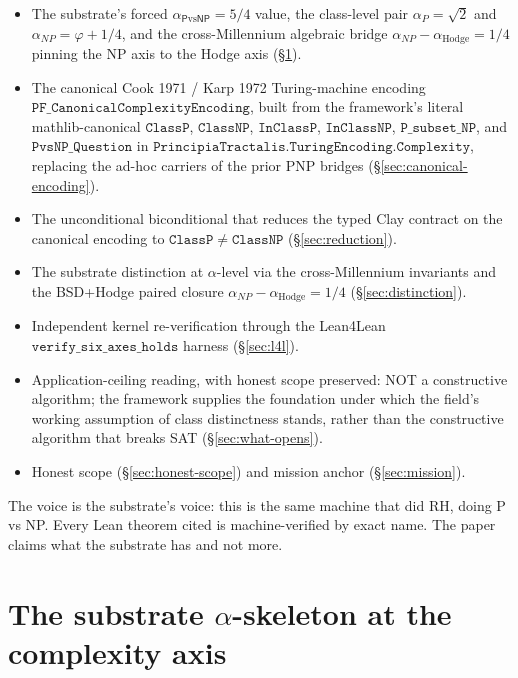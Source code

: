 \documentclass[11pt,a4paper]{article}
\theoremstyle{plain}
\theoremstyle{definition}
\begin{document}
\begin{itemize}[leftmargin=*,nosep]
\item The substrate's forced
  $\alpha_{\mathsf{P}\mathrm{vs}\mathsf{NP}} = 5/4$ value, the
  class-level pair $\alpha_{P} = \sqrt{2}$ and
  $\alpha_{NP} = \varphi + 1/4$, and the cross-Millennium algebraic
  bridge $\alpha_{NP} - \alpha_{\mathrm{Hodge}} = 1/4$ pinning the NP
  axis to the Hodge axis (\S\ref{sec:alpha-skeleton}).
\item The canonical Cook 1971 / Karp 1972 Turing-machine encoding
  $\mathtt{PF\_CanonicalComplexityEncoding}$, built from the
  framework's literal mathlib-canonical $\mathtt{ClassP}$,
  $\mathtt{ClassNP}$, $\mathtt{InClassP}$, $\mathtt{InClassNP}$,
  $\mathtt{P\_subset\_NP}$, and $\mathtt{PvsNP\_Question}$ in
  $\mathtt{PrincipiaTractalis.TuringEncoding.Complexity}$, replacing
  the ad-hoc carriers of the prior PNP bridges
  (\S\ref{sec:canonical-encoding}).
\item The unconditional biconditional that reduces the typed Clay
  contract on the canonical encoding to $\mathtt{ClassP} \neq
  \mathtt{ClassNP}$ (\S\ref{sec:reduction}).
\item The substrate distinction at $\alpha$-level via the
  cross-Millennium invariants and the BSD+Hodge paired closure
  $\alpha_{NP} - \alpha_{\mathrm{Hodge}} = 1/4$
  (\S\ref{sec:distinction}).
\item Independent kernel re-verification through the Lean4Lean
  $\mathtt{verify\_six\_axes\_holds}$ harness
  (\S\ref{sec:l4l}).
\item Application-ceiling reading, with honest scope preserved: NOT a
  constructive algorithm; the framework supplies the foundation under
  which the field's working assumption of class distinctness stands,
  rather than the constructive algorithm that breaks SAT
  (\S\ref{sec:what-opens}).
\item Honest scope (\S\ref{sec:honest-scope}) and mission anchor
  (\S\ref{sec:mission}).
\end{itemize}

The voice is the substrate's voice: this is the same machine that did
RH, doing P vs NP. Every Lean theorem cited is machine-verified by
exact name. The paper claims what the substrate has and not more.

\section{The substrate $\alpha$-skeleton at the complexity axis}
\label{sec:alpha-skeleton}
\end{document}
